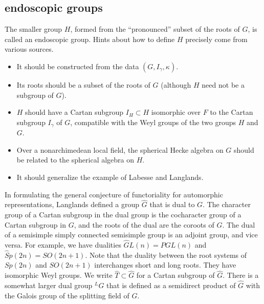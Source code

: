\documentclass[brochure,english,12pt]{bourbaki}
\newcommand{\ring}[1]{\mathbb{#1}}
\begin{document}
\subsection{endoscopic groups}\label{sec:endoscopy}

The smaller group $H$, formed from the ``pronounced'' subset of the
roots of $G$, is called an endoscopic group.  Hints about how to
define $H$ precisely come from various sources.
\begin{itemize}
\item It should be constructed from the data $(G,I_\gamma,\kappa)$.
\item Its roots should be a subset of the roots of $G$ (although $H$ need not
be a subgroup of $G$).
\item $H$ should have a Cartan subgroup $I_H\subset H$ isomorphic over $F$ to the Cartan subgroup
$I_\gamma$ of $G$, compatible with the Weyl groups of the two groups $H$ and $G$.
\item Over a nonarchimedean local field, the spherical Hecke algebra on $G$ should be related to the
spherical algebra on $H$.
\item It should generalize the example of Labesse and Langlands.
\end{itemize}

In formulating the general conjecture of functoriality for automorphic
representations, Langlands defined a group $\hat G$ that is dual to
$G$.  The character group of a Cartan subgroup in the dual group is
the cocharacter group of a Cartan subgroup in $G$, and the roots of
the dual are the coroots of $G$.  The dual of a semisimple simply
connected semisimple group is an adjoint group, and vice versa.  For
example, we have dualities $\hat GL(n) = PGL(n)$ and $\hat
Sp(2n)=SO(2n+1)$.  Note that the duality between the root systems of
$Sp(2n)$ and $SO(2n+1)$ interchanges short and long roots.  They have
isomorphic Weyl groups.  We write $\hat T\subset \hat G$ for a Cartan subgroup of $\hat G$.
There is a somewhat larger dual group ${}^LG$
that is defined as a semidirect product of $\hat G$ with the Galois
group of the splitting field of $G$.
\end{document}
